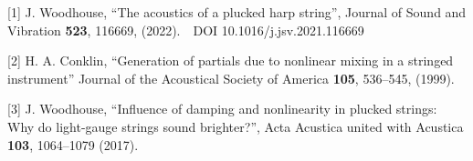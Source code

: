   \sectionreferences{}[1] J. Woodhouse, ``The acoustics of a plucked harp 
  string'', Journal of Sound and Vibration \textbf{523}, 116669, (2022).~~DOI 
  10.1016/j.jsv.2021.116669 

  [2] H. A. Conklin, ``Generation of partials due to nonlinear mixing in a 
  stringed instrument'' Journal of the Acoustical Society of America 
  \textbf{105}, 536–545, (1999). 

  [3] J. Woodhouse, ``Influence of damping and nonlinearity in plucked strings: 
  Why do light-gauge strings sound brighter?'', Acta Acustica united with 
  Acustica \textbf{103}, 1064–1079 (2017). 